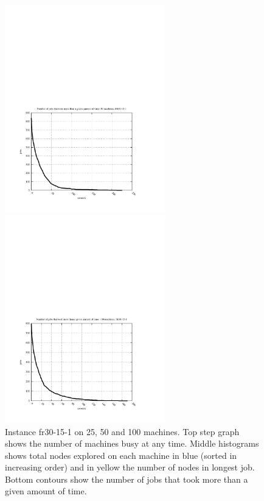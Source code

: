 \documentclass{l4proj}
\begin{document}
\begin{figure}
\begin{center}
\begin{minipage}[t]{0.3\textwidth}
\end{minipage}
\hfill
\begin{minipage}[t]{0.3\textwidth}
\includegraphics[height=9.0cm]{jobSizes-run50-frb30-15-1.pdf}
\end{minipage}
\hfill
\begin{minipage}[t]{0.3\textwidth}
\includegraphics[height=9.0cm]{jobSizes-run100-frb30-15-1.pdf}
\end{minipage}
\end{center}
\caption{Instance fr30-15-1 on 25, 50 and 100 machines. Top step graph shows the number of machines busy at any time. Middle histograms shows 
total nodes explored on each machine in blue (sorted in increasing order) and in yellow the number of nodes in longest job. 
Bottom contours show the number of jobs that took more than a given amount of time.}
\label{frb30-15-1}
\end{figure}
\end{document}
